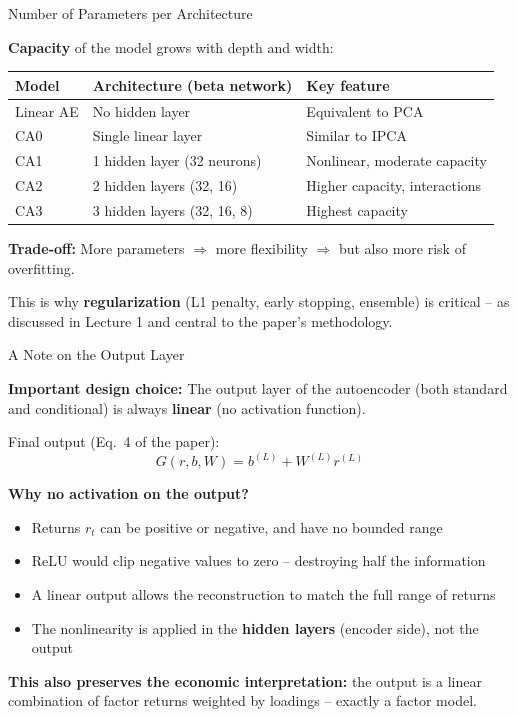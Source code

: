 \documentclass[aspectratio=169]{beamer}
\begin{document}
%
%
\begin{frame}{Number of Parameters per Architecture}

\textbf{Capacity} of the model grows with depth and width:

\vspace{0.5em}
\begin{center}
\renewcommand{\arraystretch}{1.3}
\begin{tabular}{llp{5.5cm}}
\toprule
\textbf{Model} & \textbf{Architecture (beta network)} & \textbf{Key feature} \\
\midrule
Linear AE & No hidden layer & Equivalent to PCA \\
CA0 & Single linear layer & Similar to IPCA \\
CA1 & 1 hidden layer (32 neurons) & Nonlinear, moderate capacity \\
CA2 & 2 hidden layers (32, 16) & Higher capacity, interactions \\
CA3 & 3 hidden layers (32, 16, 8) & Highest capacity \\
\bottomrule
\end{tabular}
\end{center}

\vspace{0.5em}
\textbf{Trade-off:} More parameters $\Rightarrow$ more flexibility $\Rightarrow$ but also more risk of overfitting.

\vspace{0.3em}
This is why \textbf{regularization} (L1 penalty, early stopping, ensemble) is critical -- as discussed in Lecture 1 and central to the paper's methodology.
\end{frame}
%
%
\begin{frame}{A Note on the Output Layer}

\textbf{Important design choice:} The output layer of the autoencoder (both standard and conditional) is always \textbf{linear} (no activation function).

\vspace{0.5em}
Final output (Eq.\ 4 of the paper):
\[
G(r, b, W) = b^{(L)} + W^{(L)} r^{(L)}
\]

\textbf{Why no activation on the output?}
\begin{itemize}
    \item Returns $r_t$ can be positive or negative, and have no bounded range
    \item ReLU would clip negative values to zero -- destroying half the information
    \item A linear output allows the reconstruction to match the full range of returns
    \item The nonlinearity is applied in the \textbf{hidden layers} (encoder side), not the output
\end{itemize}

\vspace{0.5em}
\textbf{This also preserves the economic interpretation:} the output is a linear combination of factor returns weighted by loadings -- exactly a factor model.
\end{frame}
\end{document}
